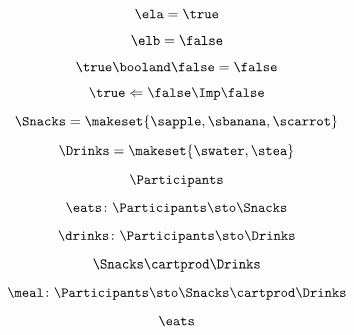 \begin{forslides}
    \begin{equation}
        \label{eq:systems-035}
        \ela = \true
    \end{equation}

    \begin{equation}
        \label{eq:systems-036}
        \elb= \false
    \end{equation}

    \begin{equation}
        \label{eq:systems-037}
        \true \booland \false = \false
    \end{equation}

    \begin{equation}
        \label{eq:systems-038}
        \true \Leftarrow \false \Imp \false
    \end{equation}

    \begin{equation}
        \label{eq:systems-039}
        \Snacks=\makeset{\sapple,\sbanana,\scarrot}
    \end{equation}

    \begin{equation}
        \label{eq:systems-040}
        \Drinks=\makeset{\swater,\stea}
    \end{equation}

    \begin{equation}
        \label{eq:systems-041}
        \Participants
    \end{equation}

    \begin{equation}
        \label{eq:systems-042}
        \eats \colon \Participants \sto \Snacks
    \end{equation}

    \begin{equation}
        \label{eq:systems-043}
        \drinks \colon  \Participants \sto \Drinks
    \end{equation}

    \begin{equation}
        \label{eq:systems-044}
        \Snacks\cartprod \Drinks
    \end{equation}

    \begin{equation}
        \label{eq:systems-045}
        \meal \colon \Participants\sto \Snacks\cartprod \Drinks
    \end{equation}

    \begin{equation}
        \label{eq:systems-046}
        \eats
    \end{equation}


\end{forslides}
